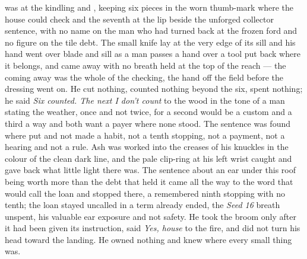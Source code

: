  was at the kindling and , keeping six pieces in the worn thumb-mark where the house could check and the seventh at the lip beside the unforged collector sentence, with no name on the man who had turned back at the frozen ford and no figure on the tile debt. The small knife lay at the very edge of its sill and his hand went over blade and sill as a man passes a hand over a tool put back where it belongs, and came away with no breath held at the top of the reach --- the coming away was the whole of the checking, the hand off the field before the dressing went on. He cut nothing, counted nothing beyond the six, spent nothing; he said \emph{Six counted. The next I don't count} to the wood in the tone of a man stating the weather, once and not twice, for a second would be a custom and a third a way and both want a payer where none stood. The sentence was found where put and not made a habit, not a tenth stopping, not a payment, not a hearing and not a rule. Ash was worked into the creases of his knuckles in the colour of the clean dark line, and the pale clip-ring at his left wrist caught and gave back what little light there was. The sentence about an ear under this roof being worth more than the debt that held it came all the way to the word that would call the loan and stopped there, a remembered ninth stopping with no tenth; the loan stayed uncalled in a term already ended, the \emph{Seed 16} breath unspent, his valuable ear exposure and not safety. He took the broom only after it had been given its instruction, said \emph{Yes, house} to the fire, and did not turn his head toward the landing. He owned nothing and knew where every small thing was.

